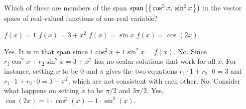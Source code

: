 \begin{Exercise}[
name={},
title={}, 
difficulty=0,
origin={\cite{JH}}]
    Which of these are members of the span
    \( \text{span}\left(\mbox{$\left\{\hspace{0.1em}\cos^2x,\;\sin^2x\hspace{0.1em}\right\}$} \right) \)
    in the vector space of real-valued functions of one real variable?
\begin{multicols}{2}
      \Question \( f(x)=1 \)
      \Question \( f(x)=3+x^2 \)
      \Question \( f(x)=\sin x \)
      \Question \( f(x)=\cos (2x) \)
\EndCurrentQuestion
\end{multicols}
\end{Exercise}

\begin{Answer}
\Question Yes. It is in that span since 
          \( 1\cos^2x+1\sin^2x=f(x) \).
\Question No. Since \( r_1\cos^2x+r_2\sin^2x=3+x^2 \) has no scalar
          solutions that work for all \( x \).
          For instance, setting $x$ to be $0$ and $\pi$ gives the two
          equations $r_1\cdot 1+r_2\cdot 0=3$ and 
          $r_1\cdot 1+r_2\cdot 0=3+\pi^2$, which are not consistent with each
          other. 
\Question No. Consider what happens on setting $x$ to be $\pi/2$ and
          $3\pi/2$.
\Question Yes, \( \cos (2x)=1\cdot\cos^2(x)-1\cdot\sin^2(x) \).

\end{Answer}

